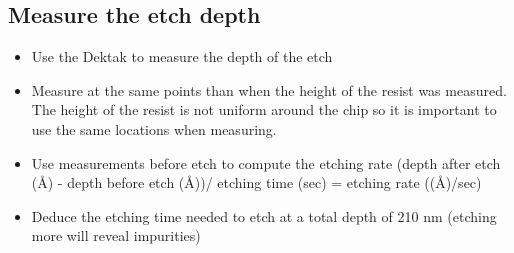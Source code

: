 \subsection{Measure the etch depth}
\begin{itemize}
\item Use the Dektak to measure the depth of the etch
\item Measure at the same points than when the height of the resist was measured. The height of the resist is not uniform around the chip so it
is important to use the same locations when measuring.
\item Use measurements before etch to compute the etching rate (depth after etch (\AA) - depth before etch (\AA))/ etching time (sec) = etching rate ((\AA)/sec)
\item Deduce the etching time needed to etch at a total depth of 210 nm (etching more will reveal impurities)
\end{itemize}
\newpage

